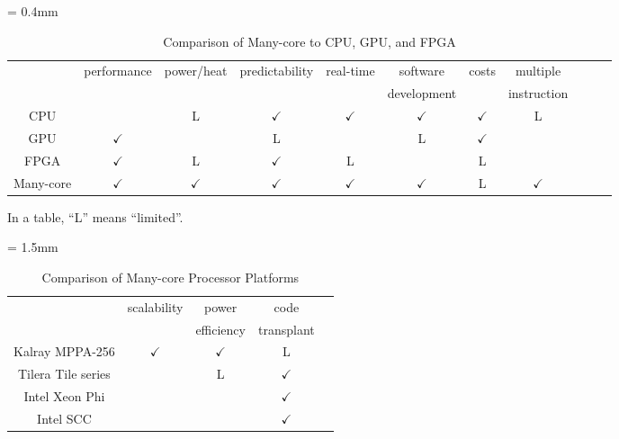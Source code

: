 \documentclass[conference,compsoc]{IEEEtran}
\newcommand{\comment}[1]{}
\begin{document}
\begin{table}[t]
  \caption{\label{tb:comparison_platforms}
    Comparison of Many-core to CPU, GPU, and FPGA}
  \vspace{-3mm}
  \centering
  \scriptsize	                    %
  \tabcolsep = 0.4mm              %
  \begin{tabular}{c|cccccccccc}
    \hline
    & \multirow{2}{*}{performance} & \multirow{2}{*}{power/heat} & \multirow{2}{*}{predictability} & \multirow{2}{*}{real-time} & software & \multirow{2}{*}{costs} & multiple\\
    &&&&& development && instruction \\
    \hline
    \hline
    CPU & & L & \(\checkmark\) & \(\checkmark\) & \(\checkmark\) & \(\checkmark\) & L \\
    GPU & \(\checkmark\) &  & L &  & L & \(\checkmark\)\\
    FPGA & \(\checkmark\) & L & \(\checkmark\) & L &  & L & \\
    Many-core & \(\checkmark\) & \(\checkmark\) & \(\checkmark\) & \(\checkmark\) & \(\checkmark\) & L & \(\checkmark\) \\
    \hline
  \end{tabular}
  \begin{flushright}
     \comment{1-23} \textasteriskcentered In a table, ``L'' means ``limited''.
  \end{flushright}
  \vspace{-5mm}
\end{table}

\begin{table}[t]
  \caption{\label{tb:comparison_manycore}
    Comparison of Many-core Processor Platforms}
  \vspace{-3mm}
  \centering
  \scriptsize	                    %
  \tabcolsep = 1.5mm              %
  \begin{tabular}{c|cccc}
    \hline
    & \multirow{2}{*}{scalability} & power  & code & \\
    & & efficiency & transplant & \\
    \hline
    \hline
    Kalray MPPA-256 \cite{de2014time} & \(\checkmark\) & \(\checkmark\) & L & \\
    Tilera Tile series \cite{bell2008tile64} &  & L & \(\checkmark\) & \\
    Intel Xeon Phi \cite{chrysos2014intel} \cite{chrysos2012intel} &  &  & \(\checkmark\) & \\
    Intel SCC \cite{baron2010single} &  &  & \(\checkmark\) & \\
    \hline
  \end{tabular}
  \vspace{-5mm}
\end{table}
\end{document}
